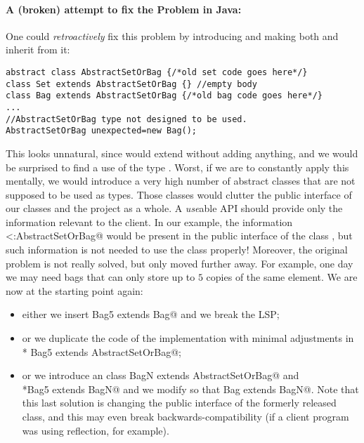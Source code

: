 \saveSpace\saveSpace\saveSpace\saveSpace
\paragraph{A (broken) attempt to fix the Problem in Java:}
One could \emph{retroactively} fix this problem by introducing \Q@AbstractSetOrBag@
and making both \Q@Bag@ and \Q@Set@ inherit from it:
\saveSpace\saveSpace
\begin{lstlisting}
abstract class AbstractSetOrBag {/*old set code goes here*/}
class Set extends AbstractSetOrBag {} //empty body
class Bag extends AbstractSetOrBag {/*old bag code goes here*/}
...
//AbstractSetOrBag type not designed to be used.
AbstractSetOrBag unexpected=new Bag(); 
\end{lstlisting}
\saveSpace\saveSpace
This looks unnatural, since \Q@Set@ would extend \Q@AbstractSetOrBag@ without adding anything,
and we would be surprised to find a use of the type \Q@AbstractSetOrBag@.
Worst, if we are to constantly apply this mentally, we would introduce a very high number
of abstract classes that are not supposed to be used as types. Those classes would clutter the 
public interface of our classes and the project as a whole.
A \emph{use}able API should provide only the information relevant to the client.
In our example, the information \Q@Set<:AbstractSetOrBag@ would be present in the public interface
of the class \Q@Set@, but such information is not needed to use the class properly!
Moreover, the original problem is not really solved, but only moved 
further away. For example, one day  we may need bags that can only store up to $5$ copies of the same element.
We are now at the starting point again:
\begin{itemize}
\item either we insert \Q@class Bag5 extends Bag@ and we break the LSP; 
\item or we duplicate the code of the \Q@Bag@ implementation with minimal
  adjustments in \\* \Q@class Bag5 extends AbstractSetOrBag@;
\item or we introduce an
\Q@abstract class BagN extends AbstractSetOrBag@ and \\*\Q@class Bag5 extends BagN@
and we modify \Q@Bag@ so that  \Q@class Bag extends BagN@.
Note that this last solution is changing the public interface of the formerly released \Q@Bag@ class, and
this may even break backwards-compatibility (if a client program was using
reflection, for example).
\end{itemize}
\saveSpace\saveSpace
